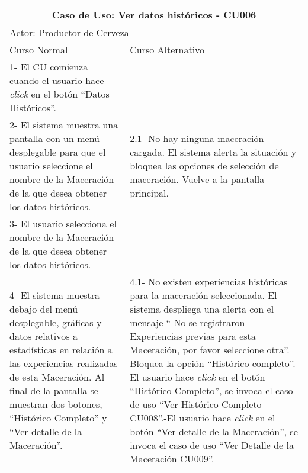     
    \begin{minipage}{0.95\textwidth}
    \begin{center}
    \begin{tabularx}{\textwidth}{ | X | X |}
        \hline
        \multicolumn{2}{|c|}{\textbf{Caso de Uso: Ver datos históricos - CU006}} \\
        \hline
        \multicolumn{2}{|l|}{Actor: Productor de Cerveza} \\
        \hline
        Curso Normal & Curso Alternativo \\
        \hline
        1- El CU comienza cuando el usuario hace \textit{click} en el botón “Datos Históricos”. & \\
        \hline
        2- El sistema muestra una pantalla con un menú desplegable para que el usuario seleccione el nombre de la Maceración de la que desea obtener los datos históricos. & 2.1- No hay ninguna maceración cargada. El sistema alerta la situación y bloquea las opciones de selección de maceración. Vuelve a la pantalla principal.\\
        \hline
        3- El usuario selecciona el nombre de la Maceración de la que desea obtener los datos históricos. &
        \\
        \hline
        4- El sistema muestra debajo del menú desplegable, gráficas y datos relativos a estadísticas en relación a las experiencias realizadas de esta Maceración. Al final de la pantalla se muestran dos botones, “Histórico Completo” y “Ver detalle de la Maceración”. & 4.1- No existen experiencias históricas para la maceración seleccionada. El sistema despliega una alerta con el mensaje “ No se registraron Experiencias previas para esta Maceración, por favor seleccione otra”. Bloquea la opción “Histórico completo”.\newline
        4.2- El usuario hace \textit{click} en el botón “Histórico Completo”, se invoca el caso de uso “Ver Histórico Completo CU008”.\newline
        4.3-El usuario hace \textit{click} en el botón “Ver detalle de la Maceración”, se invoca el caso de uso “Ver Detalle de la Maceración CU009”.
        \\
        \hline
    \end{tabularx}
    \label{CU006}
    \end{center}
    \end{minipage}
    
